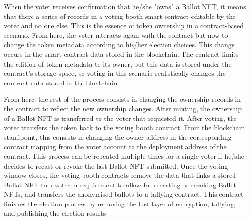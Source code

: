 \documentclass[./4_GeneralApproach.tex]{subfiles}
\begin{document}
\par
When the voter receives confirmation that he/she "owns" a Ballot NFT, it means that there a series of records in a voting booth smart contract editable by the voter and no one else. This is the essence of token ownership in a contract-based scenario. From here, the voter interacts again with the contract but now to change the token metadata according to his/her election choices. This change occurs in the smart contract data stored in the blockchain. The contract limits the edition of token metadata to its owner, but this data is stored under the contract's storage space, so voting in this scenario realistically changes the contract data stored in the blockchain.
\par
From here, the rest of the process consists in changing the ownership records in the contract to reflect the new ownership changes. After minting, the ownership of a Ballot NFT is transferred to the voter that requested it. After voting, the voter transfers the token back to the voting booth contract. From the blockchain standpoint, this consists in changing the owner address in the corresponding contract mapping from the voter account to the deployment address of the contract. This process can be repeated multiple times for a single voter if he/she decides to recast or revoke the last Ballot NFT submitted. Once the voting window closes, the voting booth contracts remove the data that links a stored Ballot NFT to a voter, a requirement to allow for recasting or revoking Ballot NFTs, and transfers the anonymised ballots to a tallying contract. This contract finishes the election process by removing the last layer of encryption, tallying, and publishing the election results
\end{document}
